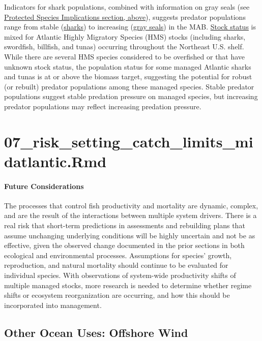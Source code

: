 \documentclass[
  10pt,
]{article}
\begin{document}
Indicators for shark populations, combined with information on gray seals (see \hyperref[protected-species]{Protected Species Implications section, above}), suggests predator populations range from stable (\href{https://noaa-edab.github.io/catalog/hms_cpue.html}{sharks}) to increasing (\href{https://noaa-edab.github.io/catalog/seal_pups.html}{gray seals}) in the MAB. \href{https://noaa-edab.github.io/catalog/hms_stock_status.html}{Stock status} is mixed for Atlantic Highly Migratory Species (HMS) stocks (including sharks, swordfish, billfish, and tunas) occurring throughout the Northeast U.S. shelf. While there are several HMS species considered to be overfished or that have unknown stock status, the population status for some managed Atlantic sharks and tunas is at or above the biomass target, suggesting the potential for robust (or rebuilt) predator populations among these managed species. Stable predator populations suggest stable predation pressure on managed species, but increasing predator populations may reflect increasing predation pressure.

\section{07\_risk\_setting\_catch\_limits\_midatlantic.Rmd}\label{risk_setting_catch_limits_midatlantic.rmd-1}

\paragraph{Future Considerations}\label{future-considerations-2}

The processes that control fish productivity and mortality are dynamic, complex, and are the result of the interactions between multiple system drivers. There is a real risk that short-term predictions in assessments and rebuilding plans that assume unchanging underlying conditions will be highly uncertain and not be as effective, given the observed change documented in the prior sections in both ecological and environmental processes. Assumptions for species' growth, reproduction, and natural mortality should continue to be evaluated for individual species. With observations of system-wide productivity shifts of multiple managed stocks, more research is needed to determine whether regime shifts or ecosystem reorganization are occurring, and how this should be incorporated into management.

\subsection{Other Ocean Uses: Offshore Wind}\label{other-ocean-uses-offshore-wind}
\end{document}
